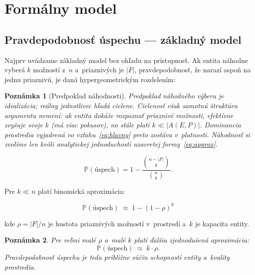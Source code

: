 \documentclass[12pt,a4paper]{article}
\newtheorem{remark}{Poznámka}[section]
\begin{document}
\section{Formálny model}

\subsection{Pravdepodobnosť úspechu — základný model}

Najprv uvádzame základný model bez ohľadu na prístupnosť. Ak entita náhodne vyberá $k$ možností z~$n$ a~priaznivých je $|F|$, pravdepodobnosť, že narazí aspoň na jednu priaznivú, je daná hypergeometrickým rozdelením:

\begin{remark}[Predpoklad náhodnosti]
Predpoklad náhodného výberu je idealizácia; reálny jednotlivec hľadá cielene. Cielenosť však samotnú štruktúru argumentu nemení: ak entita dokáže rozpoznať priaznivé možnosti, efektívne zvyšuje svoje $k$ (má viac  pokusov), no stále platí $k \ll |A(E,P)|$. Dominancia prostredia vyjadrená vo vzťahu~\eqref{eq:hlavny} preto zostáva v~platnosti. Náhodnosť si zvolíme len kvôli analytickej jednoduchosti uzavretej formy~\eqref{eq:approx}.
\end{remark}


\begin{equation}\label{eq:presny}
    \mathbb{P}(\text{úspech}) = 1 - \frac{\binom{n - |F|}{k}}{\binom{n}{k}}.
\end{equation}

Pre $k \ll n$ platí binomická aproximácia:

\begin{equation}\label{eq:approx}
    \mathbb{P}(\text{úspech}) \;\approx\; 1 - (1 - \rho)^k
\end{equation}

kde $\rho = |F|/n$ je hustota priaznivých možností v~prostredí a~$k$ je kapacita entity.

\begin{remark}
Pre veľmi malé $\rho$ a~malé $k$ platí ďalšia zjednodušená aproximácia:
\begin{equation}\label{eq:linear}
    \mathbb{P}(\text{úspech}) \;\approx\; k \cdot \rho.
\end{equation}
Pravdepodobnosť úspechu je teda približne súčin schopností entity a~kvality prostredia.
\end{remark}
\end{document}
